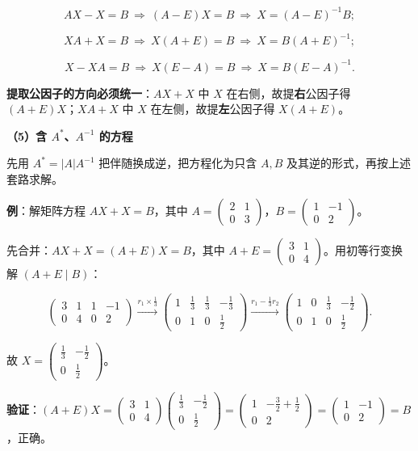 \documentclass[11pt,openany,UTF8]{ctexbook}
\begin{document}
\[AX-X=B\ \Longrightarrow\ (A-E)X=B\ \Longrightarrow\ X=(A-E)^{-1}B;\]

\[XA+X=B\ \Longrightarrow\ X(A+E)=B\ \Longrightarrow\ X=B(A+E)^{-1};\]

\[X-XA=B\ \Longrightarrow\ X(E-A)=B\ \Longrightarrow\ X=B(E-A)^{-1}.\]

\textbf{提取公因子的方向必须统一}：$AX+X$ 中 $X$ 在右侧，故提\textbf{右}公因子得 $(A+E)X$；$XA+X$ 中 $X$ 在左侧，故提\textbf{左}公因子得 $X(A+E)$。

\textbf{（5）含 $A^*$、$A^{-1}$ 的方程}

先用 $A^*=\vert A\vert A^{-1}$ 把伴随换成逆，把方程化为只含 $A,B$ 及其逆的形式，再按上述套路求解。

\textbf{例}：解矩阵方程 $AX+X=B$，其中 $A=\begin{pmatrix}2&1\\0&3\end{pmatrix}$，$B=\begin{pmatrix}1&-1\\0&2\end{pmatrix}$。

先合并：$AX+X=(A+E)X=B$，其中 $A+E=\begin{pmatrix}3&1\\0&4\end{pmatrix}$。用初等行变换解 $(A+E\mid B)$：

\[\left(\begin{array}{cccc}3&1&1&-1\\0&4&0&2\end{array}\right)\xrightarrow{r_1\times\frac13}\left(\begin{array}{cccc}1&\frac13&\frac13&-\frac13\\0&1&0&\frac12\end{array}\right)\xrightarrow{r_1-\frac13r_2}\left(\begin{array}{cccc}1&0&\frac13&-\frac12\\0&1&0&\frac12\end{array}\right).\]

故 $X=\begin{pmatrix}\frac13&-\frac12\\0&\frac12\end{pmatrix}$。

\textbf{验证}：$(A+E)X=\begin{pmatrix}3&1\\0&4\end{pmatrix}\begin{pmatrix}\frac13&-\frac12\\0&\frac12\end{pmatrix}=\begin{pmatrix}1&-\frac32+\frac12\\0&2\end{pmatrix}=\begin{pmatrix}1&-1\\0&2\end{pmatrix}=B$，正确。
\end{document}
